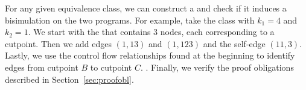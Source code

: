 For any given equivalence class, we can construct a \bisimrep{} and
check if it induces a bisimulation on the two programs. For example,
take the class with $k_1 = 4$ and $k_2 = 1$. We start with the
\bisimrep{} that contains 3 nodes, each corresponding to a cutpoint.
Then we add edges $(1,13)$ and $(1,123)$ and the self-edge $(11,3)$.
Lastly, we use the control flow relationships found at the beginning
to identify edges from cutpoint $B$ to cutpoint $C$. . Finally, we verify the proof
obligations described in Section~\ref{sec:proofobl}.
